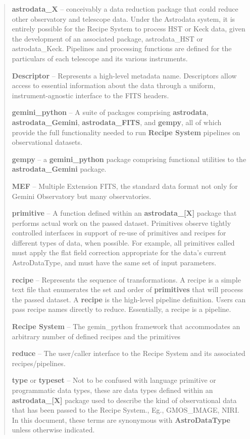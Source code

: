 \documentclass[letterpaper,10pt,english]{sphinxmanual}
\begin{document}
\begin{quote}
\textbf{astrodata\_X} -- conceivably a data reduction package that could reduce
other observatory and telescope data. Under the Astrodata system, it is
entirely possible for the Recipe System to process HST or Keck data, given
the development of an associated package, astrodata\_HST or astrodata\_Keck.
Pipelines and processing functions are defined for the particulars of each
telescope and its various instruments.

\textbf{Descriptor} -- Represents a high-level metadata name. Descriptors allow
access to essential information about the data through a uniform,
instrument-agnostic interface to the FITS headers.

\textbf{gemini\_python} -- A suite of packages comprising \textbf{astrodata},
\textbf{astrodata\_Gemini}, \textbf{astrodata\_FITS}, and \textbf{gempy}, all of which provide
the full functionality needed to run \textbf{Recipe System}  pipelines on
observational datasets.

\textbf{gempy} -- a \textbf{gemini\_python} package comprising functional utilities to
the \textbf{astrodata\_Gemini} package.

\textbf{MEF} -- Multiple Extension FITS, the standard data format not only for
Gemini Observatory but many observatories.

\textbf{primitive} -- A function defined within an \textbf{astrodata\_{[}X{]}} package that
performs actual work on the passed dataset. Primitives observe tightly
controlled interfaces in support of re-use of primitives and recipes for
different types of data, when possible. For example, all primitives called
 must apply the flat field correction appropriate for the data’s
current AstroDataType, and must have the same set of input parameters.

\textbf{recipe} -- Represents the sequence of transformations. A recipe is a
simple text file that enumerates the set and order of \textbf{primitives} that will
process the passed dataset. A \textbf{recipe} is the high-level pipeline definition.
Users can pass recipe names directly to reduce. Essentially, a recipe is a
pipeline.

\textbf{Recipe System} -- The gemin\_python framework that accommodates an arbitrary
number of defined recipes and the primitives

\textbf{reduce} -- The user/caller interface to the Recipe System and its associated
recipes/pipelines.

\textbf{type} or \textbf{typeset} --  Not to be confused with language primitive or
programmatic data types, these are data types defined within an
\textbf{astrodata\_{[}X{]}} package used to describe the kind of observational data that
has been passed to the Recipe System., Eg., GMOS\_IMAGE, NIRI. In this document,
these terms are synonymous with \textbf{AstroDataType} unless otherwise indicated.
\end{quote}
\end{document}
